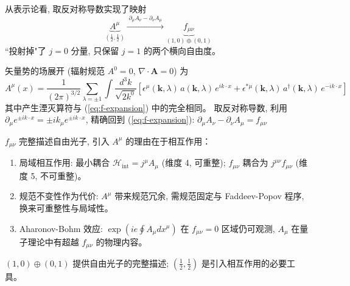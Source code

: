 从表示论看, 取反对称导数实现了映射
\begin{equation}
    \underbrace{A^\mu}_{(\frac{1}{2},\frac{1}{2})}
    \xrightarrow{\;\partial_\mu A_\nu - \partial_\nu A_\mu\;}
    \underbrace{f_{\mu\nu}}_{(1,0)\oplus(0,1)}
\end{equation}
``投射掉"了 $j=0$ 分量, 只保留 $j=1$ 的两个横向自由度。

矢量势的场展开 (辐射规范 $A^0=0$, $\nabla\cdot\boldsymbol{A}=0$) 为
\begin{equation}
    A^\mu(x) = \frac{1}{(2\pi)^{3/2}} \sum_{\lambda=\pm 1}
    \int \frac{d^3k}{\sqrt{2k^0}}
    \left[\epsilon^\mu(\mathbf{k},\lambda)\,a(\mathbf{k},\lambda)\,e^{ik\cdot x}
    + \epsilon^{*\mu}(\mathbf{k},\lambda)\,a^\dagger(\mathbf{k},\lambda)\,e^{-ik\cdot x}\right]
\end{equation}
其中产生湮灭算符与 (\ref{eq:f-expansion}) 中的完全相同。
取反对称导数, 利用 $\partial_\mu e^{\pm ik\cdot x}=\pm ik_\mu e^{\pm ik\cdot x}$,
精确回到 (\ref{eq:f-expansion}): $\partial_\mu A_\nu - \partial_\nu A_\mu = f_{\mu\nu}$


$f_{\mu\nu}$ 完整描述自由光子, 引入 $A^\mu$ 的理由在于相互作用：

\begin{enumerate}
    \item 局域相互作用:
    最小耦合 $\mathscr{H}_{\text{int}}=j^\mu A_\mu$ (维度 4, 可重整);
    $f_{\mu\nu}$ 耦合为 $j^{\mu\nu}f_{\mu\nu}$ (维度 5, 不可重整)。
    
    \item 规范不变性作为代价:
    $A^\mu$ 带来规范冗余, 需规范固定与 Faddeev-Popov 程序,
    换来可重整性与局域性。
    
    \item Aharonov-Bohm 效应:
    $\exp(ie\oint A_\mu dx^\mu)$ 在 $f_{\mu\nu}=0$ 区域仍可观测,
    $A_\mu$ 在量子理论中有超越 $f_{\mu\nu}$ 的物理内容。
\end{enumerate}

$(1,0)\oplus(0,1)$ 提供自由光子的完整描述;
$(\frac{1}{2},\frac{1}{2})$ 是引入相互作用的必要工具。


